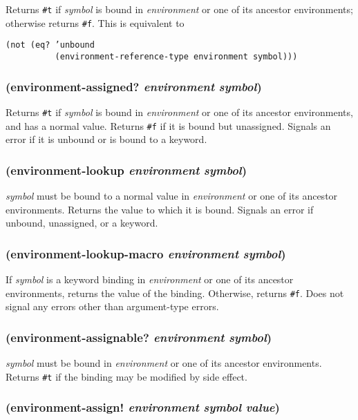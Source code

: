\documentclass{article}
\begin{document}
Returns \verb|#t| if \emph{symbol} is bound in \emph{environment} or one of its ancestor
environments; otherwise returns \verb|#f|. This is equivalent to

\begin{verbatim}
(not (eq? ’unbound
          (environment-reference-type environment symbol)))
\end{verbatim}

\subsubsection{(environment-assigned? \emph{environment} \emph{symbol})}

Returns \verb|#t| if \emph{symbol} is bound in \emph{environment} or one of its ancestor
environments, and has a normal value. Returns \verb|#f| if it is bound but unassigned.
Signals an error if it is unbound or is bound to a keyword.

\subsubsection{(environment-lookup \emph{environment} \emph{symbol})}

\emph{symbol} must be bound to a normal value in \emph{environment} or one of its ancestor
environments. Returns the value to which it is bound. Signals an error if unbound, unassigned,
or a keyword.

\subsubsection{(environment-lookup-macro \emph{environment} \emph{symbol})}

If \emph{symbol} is a keyword binding in \emph{environment} or one of its ancestor
environments, returns the value of the binding. Otherwise, returns \verb|#f|. Does not
signal any errors other than argument-type errors.

\subsubsection{(environment-assignable? \emph{environment} \emph{symbol})}

\emph{symbol} must be bound in \emph{environment} or one of its ancestor environments. Returns
\verb|#t| if the binding may be modified by side effect.

\subsubsection{(environment-assign! \emph{environment} \emph{symbol} \emph{value})}
\end{document}
